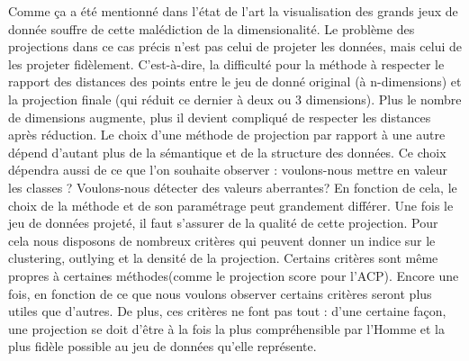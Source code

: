 Comme ça a été mentionné dans l’état de l’art la visualisation des grands jeux de donnée souffre de cette malédiction de la dimensionalité. Le problème des projections dans ce cas précis n’est pas celui de projeter les données, mais celui de les projeter fidèlement. 
C’est-à-dire, la difficulté pour la méthode à respecter le rapport des distances des points entre le jeu de donné original (à n-dimensions) et la projection finale (qui réduit ce dernier à deux ou 3 dimensions). 
Plus le nombre de dimensions augmente, plus il devient compliqué de respecter les distances après réduction. 
\newline
Le choix d’une méthode de projection par rapport à une autre dépend d'autant plus de la sémantique et de la structure des données. Ce choix dépendra aussi de ce que l’on souhaite observer : voulons-nous mettre en valeur les classes ? Voulons-nous détecter des valeurs aberrantes? 
En fonction de cela, le choix de la méthode et de son paramétrage peut grandement différer.
\smallskip
Une fois le jeu de données projeté, il faut s’assurer de la qualité de cette projection.
Pour cela nous disposons de nombreux critères qui peuvent donner un indice sur le clustering, outlying et la densité de la projection. Certains critères sont même propres à certaines méthodes(comme le projection score pour l'ACP).
Encore une fois, en fonction de ce que nous voulons observer certains critères seront plus utiles que d'autres. De plus, ces critères ne font pas tout : d’une certaine façon, une projection se doit d’être à la fois la plus compréhensible par l’Homme et la plus fidèle possible au jeu de données qu’elle représente.


